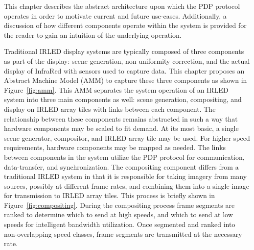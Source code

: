 \label{chap:machine_model}


This chapter describes the abstract architecture upon which the PDP protocol operates in order to motivate current and future use-cases. Additionally, a discussion of how different components operate within the system is provided for the reader to gain an intuition of the underlying operation.

Traditional IRLED display systems are typically composed of three components as part of the display: scene generation, non-uniformity correction, and the actual display of InfraRed with sensors used to capture data. This chapter proposes an Abstract Machine Model (AMM) to capture these three components as shown in Figure~\ref{fig:amm}. This AMM separates the system operation of an IRLED system into three main components as well: scene generation, compositing, and display on IRLED array tiles with links between each component. The relationship between these components remains abstracted in such a way that hardware components may be scaled to fit demand. At its most basic, a single scene generator, compositor, and IRLED array tile may be used. For higher speed requirements, hardware components may be mapped as needed. The links between components in the system utilize the PDP protocol for communication, data-transfer, and synchronization. The compositing component differs from a traditional IRLED system in that it is responsible for taking imagery from many sources, possibly at different frame rates, and combining them into a single image for transmission to IRLED array tiles. This process is briefly shown in Figure~\ref{fig:compositing}. During the compositing process frame segments are ranked to determine which to send at high speeds, and which to send at low speeds for intelligent bandwidth utilization. Once segmented and ranked into non-overlapping speed classes, frame segments are transmitted at the necessary rate.

